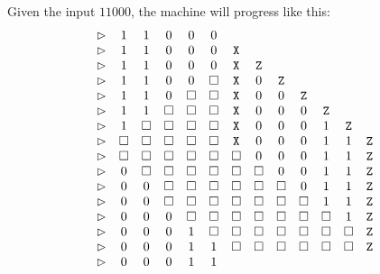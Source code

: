 \documentclass[12pt]{extarticle}
\begin{document}
Given the input $11000$, the machine will progress like this:
\[
\begin{array}{c c c c c c c c c c c c c l}
\vartriangleright & 1 & 1 & 0 & 0 & 0 \\
\vartriangleright & 1 & 1 & 0 & 0 & 0 & \texttt{X} \\
\vartriangleright & 1 & 1 & 0 & 0 & 0 & \texttt{X} & \texttt{Z} \\
\vartriangleright & 1 & 1 & 0 & 0 & \square  & \texttt{X} & 0 & \texttt{Z} \\
\vartriangleright & 1 & 1 & 0 & \square  & \square  & \texttt{X} & 0 & 0 & \texttt{Z} \\
\vartriangleright & 1 & 1 & \square  & \square  & \square  & \texttt{X} & 0 & 0 & 0 & \texttt{Z} \\
\vartriangleright & 1 & \square  & \square  & \square  & \square  & \texttt{X} & 0 & 0 & 0 & 1 & \texttt{Z} \\
\vartriangleright & \square  & \square  & \square  & \square  & \square  & \texttt{X} & 0 & 0 & 0 & 1 & 1 & \texttt{Z} \\
\vartriangleright & \square  & \square  & \square  & \square  & \square  & \square  & 0 & 0 & 0 & 1 & 1 & \texttt{Z} \\
\vartriangleright & 0 & \square  & \square  & \square  & \square  & \square  & \square  & 0 & 0 & 1 & 1 & \texttt{Z} \\
\vartriangleright & 0 & 0 & \square  & \square  & \square  & \square  & \square  & \square  & 0 & 1 & 1 & \texttt{Z} \\
\vartriangleright & 0 & 0 & \square  & \square  & \square  & \square  & \square  & \square  & \square  & 1 & 1 & \texttt{Z} \\
\vartriangleright & 0 & 0 & 0 & \square  & \square  & \square  & \square  & \square  & \square  & \square  & 1 & \texttt{Z} \\
\vartriangleright & 0 & 0 & 0 & 1 & \square  & \square  & \square  & \square  & \square  & \square  & \square  & \texttt{Z} \\
\vartriangleright & 0 & 0 & 0 & 1 & 1 & \square  & \square  & \square  & \square  & \square  & \square  & \texttt{Z} \\
\vartriangleright & 0 & 0 & 0 & 1 & 1 \\
\end{array}
\]

\end{document}

